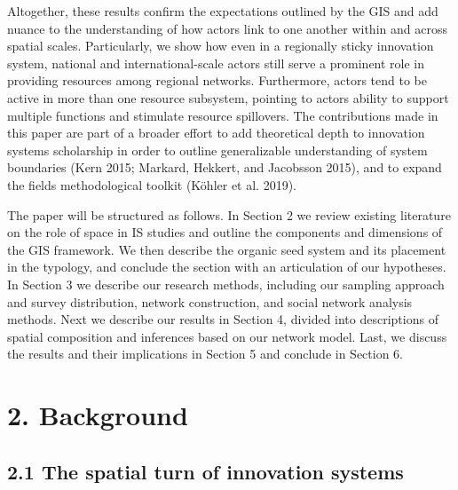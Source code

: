 \documentclass[twoside,12pt,final]{ucthesis-CA2012}
\begin{document}
\begin{ucmainmatter}
Altogether, these results confirm the expectations outlined by the GIS
and add nuance to the understanding of how actors link to one another
within and across spatial scales. Particularly, we show how even in a
regionally sticky innovation system, national and international-scale
actors still serve a prominent role in providing resources among
regional networks. Furthermore, actors tend to be active in more than
one resource subsystem, pointing to actors\textquotesingle{} ability to support multiple
functions and stimulate resource spillovers. The contributions made in
this paper are part of a broader effort to add theoretical depth to
innovation systems scholarship in order to outline generalizable
understanding of system boundaries (Kern 2015; Markard, Hekkert, and
Jacobsson 2015), and to
expand the field\textquotesingle s methodological toolkit (Köhler et al.
2019).

The paper will be structured as follows. In Section 2 we review existing
literature on the role of space in IS studies and outline the components
and dimensions of the GIS framework. We then describe the organic seed
system and its placement in the typology, and conclude the section with
an articulation of our hypotheses. In Section 3 we describe our research
methods, including our sampling approach and survey distribution,
network construction, and social network analysis methods. Next we
describe our results in Section 4, divided into descriptions of spatial
composition and inferences based on our network model. Last, we discuss
the results and their implications in Section 5 and conclude in Section
6.

\hypertarget{background-1}{%
\section{2. Background}\label{background-1}}

\hypertarget{the-spatial-turn-of-innovation-systems}{%
\subsection{2.1 The spatial turn of innovation systems}\label{the-spatial-turn-of-innovation-systems}}


\end{ucmainmatter}
\end{document}
